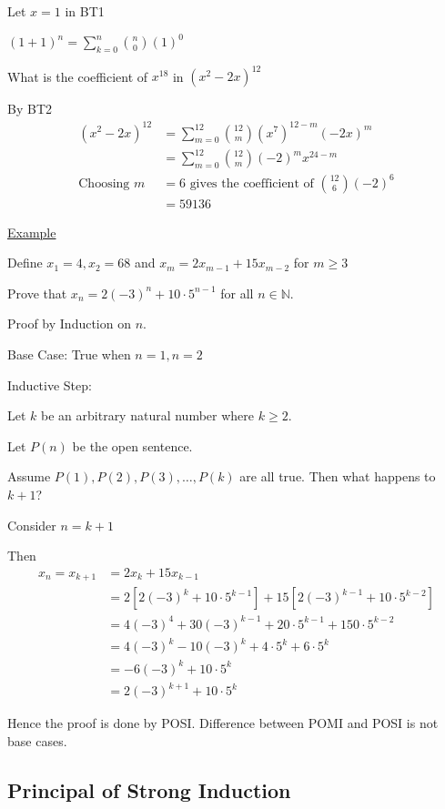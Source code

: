 \documentclass{article}
\begin{document}
Let $x=1$ in BT1

$(1+1)^n = \sum_{k=0}^{n}\binom{n}{0}(1)^0$

What is the coefficient of $x^{18}$ in $(x^2-2x)^{12}$

By BT2
\begin{align*}
    (x^2-2x)^{12} &= \sum_{m=0}^{12}\binom{12}{m}(x^7)^{12-m}(-2x)^m \\
    &= \sum_{m=0}^{12}\binom{12}{m}(-2)^mx^{24-m}\\
    \text{Choosing } m&=6 \text{ gives the coefficient of } \binom{12}{6}(-2)^6 \\
    &= 59136
\end{align*}


\underline{Example}

Define $x_1=4, x_2 =68$ and $x_m = 2x_{m-1} + 15x_{m-2}$ for $m \ge 3$

Prove that $x_n = 2(-3)^n + 10 \cdot 5^{n-1}$ for all $n \in \mathbb{N}$.

Proof by Induction on $n$. 

Base Case: True when $n=1, n=2$

Inductive Step:

Let $k$ be an arbitrary natural number where $k \ge 2$. 

Let $P(n)$ be the open sentence.

Assume $P(1), P(2), P(3), \ldots, P(k)$ are all true. Then what happens to $k+1$?

Consider $n = k+1$

Then
\begin{align*}
    x_n = x_{k+1} &= 2x_k + 15x_{k-1} \\
    &= 2[2(-3)^k + 10 \cdot 5^{k-1}] + 15[2(-3)^{k-1}+10 \cdot 5^{k-2}] \\
    &= 4(-3)^4 + 30(-3)^{k-1} + 20 \cdot 5^{k-1} + 150 \cdot 5^{k-2} \\
    &= 4(-3)^k - 10(-3)^k + 4 \cdot 5^k + 6 \cdot 5^k \\
    &= -6(-3)^k + 10 \cdot 5^k \\
    &= 2(-3)^{k+1} + 10 \cdot 5^k
\end{align*}

Hence the proof is done by POSI. Difference between POMI and POSI is not base cases.

\subsection{Principal of Strong Induction}
\end{document}
